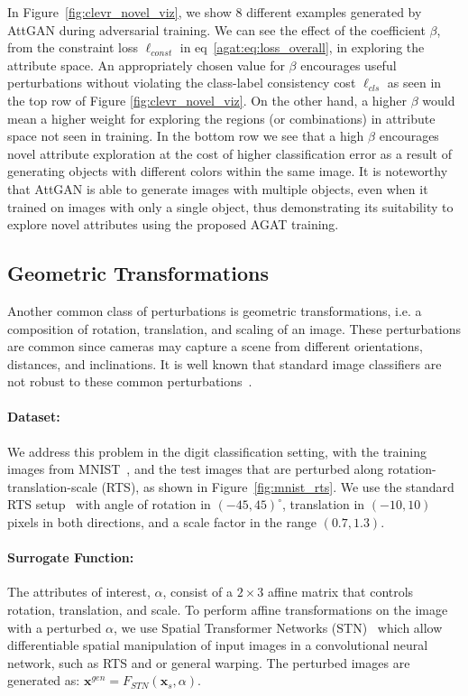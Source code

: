     In Figure~\ref{fig:clevr_novel_viz}, we show 8 different examples generated by AttGAN during adversarial training. We can see the effect of the coefficient $\beta$, from the constraint loss $\ell_{const}$ in eq~\eqref{agat:eq:loss_overall}, in exploring the attribute space. An appropriately chosen value for $\beta$ encourages useful perturbations without violating the class-label consistency cost $\ell_{cls}$ as seen in the top row of Figure \ref{fig:clevr_novel_viz}. On the other hand, a higher $\beta$ would mean a higher weight for exploring the regions (or combinations) in attribute space not seen in training. In the bottom row we see that a high $\beta$ encourages novel attribute exploration at the cost of higher classification error as a result of generating objects with different colors within the same image.  It is noteworthy that AttGAN is able to generate images with multiple objects, even when it trained on images with only a single object, thus demonstrating its suitability to explore novel attributes using the proposed AGAT training.

\subsection{Geometric Transformations}
Another common class of perturbations is geometric transformations, i.e. a composition of rotation, translation, and scaling of an image. These perturbations are common since cameras may capture a scene from different orientations, distances, and inclinations. It is well known that standard image classifiers are not robust to these common perturbations~\citep{cohen2014transformation}.

    \paragraph{Dataset:}
    We address this problem in the digit classification setting, with
    the training images from MNIST~\citep{lecun1998mnist}, and the test images that are perturbed along rotation-translation-scale (RTS), as shown in Figure~\ref{fig:mnist_rts}.
    We use the standard RTS setup~\citep{jaderberg2015spatial} with angle of rotation in $(-45, 45)^{\circ}$, translation in $(-10, 10)$ pixels in both directions, and a scale factor in the range $(0.7, 1.3)$.

    \paragraph{Surrogate Function:}
    The attributes of interest, $\alpha$, consist of a $2\times3$ affine matrix that controls rotation, translation, and scale. To perform affine transformations on the image with a perturbed $\alpha$, we use Spatial Transformer Networks (STN)~\citep{jaderberg2015spatial} which allow differentiable spatial manipulation of input images in a convolutional neural network, such as RTS and or general warping. The perturbed images are generated as: $\mathbf{x}^{gen} = F_{STN}(\mathbf{x}_s, \alpha)$.

